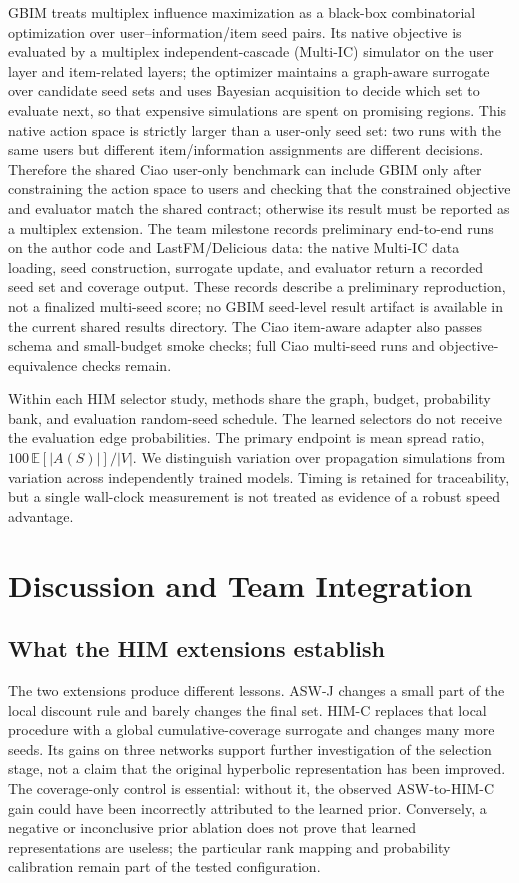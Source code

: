 \documentclass[10pt,twocolumn]{article}
\begin{document}
GBIM treats multiplex influence maximization as a black-box combinatorial optimization over user--information/item seed pairs. Its native objective is evaluated by a multiplex independent-cascade (Multi-IC) simulator on the user layer and item-related layers; the optimizer maintains a graph-aware surrogate over candidate seed sets and uses Bayesian acquisition to decide which set to evaluate next, so that expensive simulations are spent on promising regions. This native action space is strictly larger than a user-only seed set: two runs with the same users but different item/information assignments are different decisions. Therefore the shared Ciao user-only benchmark can include GBIM only after constraining the action space to users and checking that the constrained objective and evaluator match the shared contract; otherwise its result must be reported as a multiplex extension. The team milestone records preliminary end-to-end runs on the author code and LastFM/Delicious data: the native Multi-IC data loading, seed construction, surrogate update, and evaluator return a recorded seed set and coverage output. These records describe a preliminary reproduction, not a finalized multi-seed score; no GBIM seed-level result artifact is available in the current shared results directory. The Ciao item-aware adapter also passes schema and small-budget smoke checks; full Ciao multi-seed runs and objective-equivalence checks remain.

Within each HIM selector study, methods share the graph, budget, probability bank, and evaluation random-seed schedule. The learned selectors do not receive the evaluation edge probabilities. The primary endpoint is mean spread ratio, $100\,\mathbb{E}[|A(S)|]/|V|$. We distinguish variation over propagation simulations from variation across independently trained models. Timing is retained for traceability, but a single wall-clock measurement is not treated as evidence of a robust speed advantage.



\section{Discussion and Team Integration}
\subsection{What the HIM extensions establish}
The two extensions produce different lessons. ASW-J changes a small part of the local discount rule and barely changes the final set. HIM-C replaces that local procedure with a global cumulative-coverage surrogate and changes many more seeds. Its gains on three networks support further investigation of the selection stage, not a claim that the original hyperbolic representation has been improved. The coverage-only control is essential: without it, the observed ASW-to-HIM-C gain could have been incorrectly attributed to the learned prior. Conversely, a negative or inconclusive prior ablation does not prove that learned representations are useless; the particular rank mapping and probability calibration remain part of the tested configuration.
\end{document}
